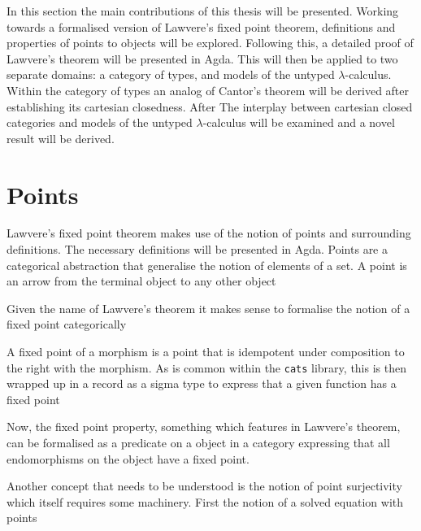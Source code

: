 In this section the main contributions of this thesis will be presented. Working
towards a formalised version of Lawvere's fixed point theorem, definitions and
properties of points to objects will be explored. Following this, a detailed
proof of Lawvere's theorem will be presented in Agda. This will then be applied
to two separate domains: a category of types, and models of the untyped
$\lambda$-calculus. Within the category of types an analog of Cantor's theorem
will be derived after establishing its cartesian closedness. After The interplay
between cartesian closed categories and models of the untyped $\lambda$-calculus
will be examined and a novel result will be derived.
\section{Points}
Lawvere's fixed point theorem makes use of the notion of points and surrounding
definitions. The necessary definitions will be presented in Agda. Points are a
categorical abstraction that generalise the notion of elements of a set. A point
is an arrow from the terminal object to any other object


Given the name of Lawvere's theorem it makes sense to formalise the notion of a
fixed point categorically


A fixed point of a morphism is a point that is idempotent under composition to
the right with the morphism. As is common within the \verb|cats| library, this is
then wrapped up in a record as a sigma type to express that a given function has
a fixed point


Now, the fixed point property, something which features in Lawvere's theorem, can be
formalised as a predicate on a object in a category expressing that all
endomorphisms on the object have a fixed point.


Another concept that needs to be understood is the notion of point surjectivity
which itself requires some machinery. First the notion of a solved equation with
points


